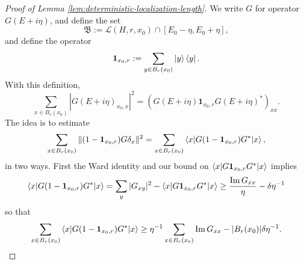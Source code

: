 \documentclass[11pt]{amsart}
\def\One{{\mathbf{1}}}
\newcommand{\Impt}{\operatorname*{Im}}
\def\bra#1{\mathinner{\langle{#1}|}}
\def\ket#1{\mathinner{|{#1}\rangle}}
\def\braket#1{\mathinner{\langle{#1}\rangle}}
\newcommand{\mcal}[1]{{\mathcal{#1}}}
\numberwithin{equation}{section}
\numberwithin{theorem}{section}
\begin{document}
\begin{proof}[Proof of Lemma \ref{lem:deterministic-localization-length}]
We write $G$ for operator $G(E+i\eta)$, and define the set
$$\mathfrak{B}:= \mcal{L}(H,r,x_0)\cap[E_0-\eta,E_0+\eta],$$
and define the operator
\[
\One_{x_0,r} :=
\sum_{y\in B_r(x_0)}
\ket{y}\bra{y}.
\]
With this definition,
\[
\sum_{x\in B_r(x_0)}
|G(E+i\eta)_{x_0,x}|^2
= (G(E+i\eta) \One_{x_0,r}G(E+i\eta)^*)_{xx}.
\]
The idea is to estimate
$$\sum_{x\in B_{r}(x_0)} \|(1-\One_{x_0,r})G\delta_x\|^2 = \sum_{x\in B_r(x_0)} \braket{x|G(1-\One_{x_0,r})G^*|x},$$
in two ways.
First the Ward identity and our bound on $\braket{x|G \One_{x_0,r} G^*|x}$ implies
\begin{equation*}
\braket{x|G(1-\One_{x_0,r})G^*|x}
= \sum_{y}|G_{xy}|^2 -  \braket{x|G\One_{x_0,r}G^*|x}
\geq \frac{\Impt G_{xx}}{\eta}- \delta \eta^{-1}
\end{equation*}
so that
\begin{equation}
\label{eq:one-bd}
\sum_{x\in B_r(x_0)}
\braket{x|G(1-\One_{x_0,r})G^*|x} \geq \eta^{-1} \sum_{x\in B_r(x_0)} \Impt G_{xx} -  |B_r(x_0)| \delta\eta^{-1}.
\end{equation}


\end{proof}
\end{document}
